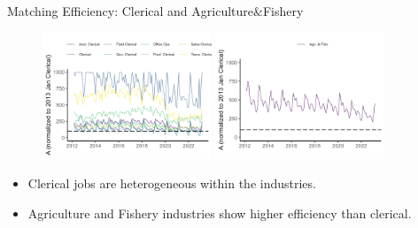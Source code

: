 \documentclass[aspectratio=169]{beamer}
\begin{document}
\begin{frame}{Matching Efficiency: Clerical and Agriculture\&Fishery}
\begin{figure}[!ht]
  \begin{center}
  \includegraphics[width = 0.45\textwidth]
  {figuretable/matching_efficiency_month_aggregate_clerical.png}
  \includegraphics[width = 0.45\textwidth]
  {figuretable/matching_efficiency_month_aggregate_agriculture_forestry_and_fishing.png}
  \end{center}
  \footnotesize
\end{figure} 
    \begin{itemize}
        \item Clerical jobs are heterogeneous within the industries.
        \item Agriculture and Fishery industries show higher efficiency than clerical.
    \end{itemize}
\end{frame}

\end{document}

